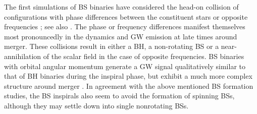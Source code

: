 \documentclass[]{iopart}
\begin{document}
The first simulations of BS binaries have considered the
head-on collision of configurations with phase differences
between the constituent stars or opposite frequencies
\cite{Palenzuela:2006wp}; see also
\cite{Choptuik:2009ww,Bezares:2017mzk}.
The phase or frequency differences manifest themselves most
pronouncedly in the dynamics and GW emission at late times
around merger. These collisions result in either
a BH, a non-rotating BS or a near-annihilation of the scalar
field in the case of opposite frequencies. BS binaries
with orbital angular momentum generate a GW signal
qualitatively similar to that of BH binaries during the
inspiral phase, but exhibit a much more complex structure around
merger \cite{Palenzuela:2007dm,Palenzuela:2017kcg}.
In agreement with the above mentioned BS formation 
studies, the BS inspirals also seem to avoid the formation
of spinning BSs, although they may settle down into
single nonrotating BSs.
\end{document}
